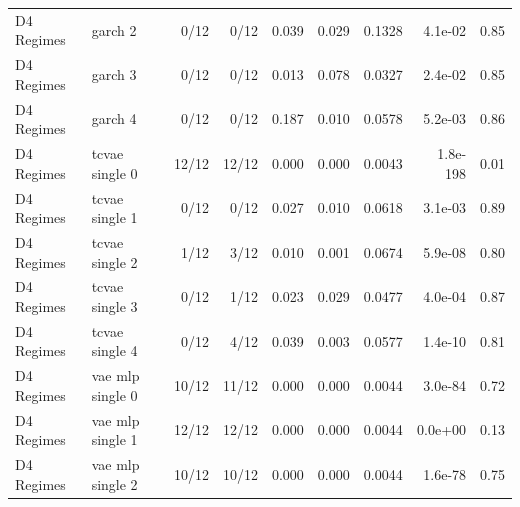 \begin{tabular}{llrrrrrrr}
D4 Regimes & garch 2 & 0/12 & 0/12 & 0.039 & 0.029 & 0.1328 & 4.1e-02 & 0.85 \\
D4 Regimes & garch 3 & 0/12 & 0/12 & 0.013 & 0.078 & 0.0327 & 2.4e-02 & 0.85 \\
D4 Regimes & garch 4 & 0/12 & 0/12 & 0.187 & 0.010 & 0.0578 & 5.2e-03 & 0.86 \\
D4 Regimes & tcvae single 0 & 12/12 & 12/12 & 0.000 & 0.000 & 0.0043 & 1.8e-198 & 0.01 \\
D4 Regimes & tcvae single 1 & 0/12 & 0/12 & 0.027 & 0.010 & 0.0618 & 3.1e-03 & 0.89 \\
D4 Regimes & tcvae single 2 & 1/12 & 3/12 & 0.010 & 0.001 & 0.0674 & 5.9e-08 & 0.80 \\
D4 Regimes & tcvae single 3 & 0/12 & 1/12 & 0.023 & 0.029 & 0.0477 & 4.0e-04 & 0.87 \\
D4 Regimes & tcvae single 4 & 0/12 & 4/12 & 0.039 & 0.003 & 0.0577 & 1.4e-10 & 0.81 \\
D4 Regimes & vae mlp single 0 & 10/12 & 11/12 & 0.000 & 0.000 & 0.0044 & 3.0e-84 & 0.72 \\
D4 Regimes & vae mlp single 1 & 12/12 & 12/12 & 0.000 & 0.000 & 0.0044 & 0.0e+00 & 0.13 \\
D4 Regimes & vae mlp single 2 & 10/12 & 10/12 & 0.000 & 0.000 & 0.0044 & 1.6e-78 & 0.75 \\
\bottomrule
\end{tabular}
